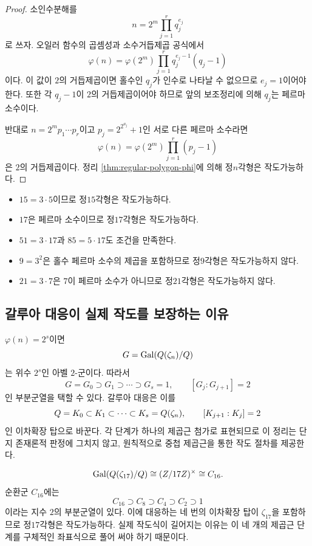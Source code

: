 \begin{proof}
소인수분해를
\[
  n=2^m\prod_{j=1}^r q_j^{e_j}
\]
로 쓰자. 오일러 함수의 곱셈성과 소수거듭제곱 공식에서
\[
  \varphi(n)
  =\varphi(2^m)\prod_{j=1}^r q_j^{e_j-1}(q_j-1)
\]
이다. 이 값이 $2$의 거듭제곱이면 홀수인 $q_j$가 인수로 나타날 수 없으므로 $e_j=1$이어야 한다. 또한 각 $q_j-1$이 $2$의 거듭제곱이어야 하므로 앞의 보조정리에 의해 $q_j$는 페르마 소수이다.

반대로 $n=2^m p_1\cdots p_r$이고 $p_j=2^{2^{a_j}}+1$인 서로 다른 페르마 소수라면
\[
  \varphi(n)
  =\varphi(2^m)\prod_{j=1}^r(p_j-1)
\]
은 $2$의 거듭제곱이다. 정리 \ref{thm:regular-polygon-phi}에 의해 정$n$각형은 작도가능하다.
\end{proof}

\begin{example}
\begin{itemize}
  \item $15=3\cdot5$이므로 정$15$각형은 작도가능하다.
  \item $17$은 페르마 소수이므로 정$17$각형은 작도가능하다.
  \item $51=3\cdot17$과 $85=5\cdot17$도 조건을 만족한다.
  \item $9=3^2$은 홀수 페르마 소수의 제곱을 포함하므로 정$9$각형은 작도가능하지 않다.
  \item $21=3\cdot7$은 $7$이 페르마 소수가 아니므로 정$21$각형은 작도가능하지 않다.
\end{itemize}
\end{example}

\subsection{갈루아 대응이 실제 작도를 보장하는 이유}

$\varphi(n)=2^s$이면
\[
  G=\operatorname{Gal}(Q(\zeta_n)/Q)
\]
는 위수 $2^s$인 아벨 $2$-군이다. 따라서
\[
  G=G_0\supset G_1\supset\cdots\supset G_s=1,
  \qquad [G_j:G_{j+1}]=2
\]
인 부분군열을 택할 수 있다. 갈루아 대응은 이를
\[
  Q=K_0\subset K_1\subset\cdots\subset K_s=Q(\zeta_n),
  \qquad [K_{j+1}:K_j]=2
\]
인 이차확장 탑으로 바꾼다. 각 단계가 하나의 제곱근 첨가로 표현되므로 이 정리는 단지 존재론적 판정에 그치지 않고, 원칙적으로 중첩 제곱근을 통한 작도 절차를 제공한다.

\begin{example}[정$17$각형]
\[
  \operatorname{Gal}(Q(\zeta_{17})/Q)
  \cong(Z/17Z)^\times\cong C_{16}.
\]
순환군 $C_{16}$에는
\[
  C_{16}\supset C_8\supset C_4\supset C_2\supset1
\]
이라는 지수 $2$의 부분군열이 있다. 이에 대응하는 네 번의 이차확장 탑이 $\zeta_{17}$을 포함하므로 정$17$각형은 작도가능하다. 실제 작도식이 길어지는 이유는 이 네 개의 제곱근 단계를 구체적인 좌표식으로 풀어 써야 하기 때문이다.
\end{example}

